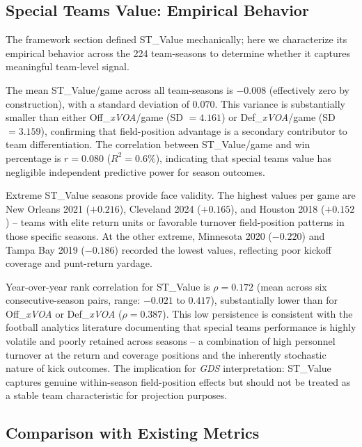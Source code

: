 \documentclass[12pt,a4paper]{article}
\newcommand{\xvoa}{\textit{xVOA}}
\newcommand{\gds}{\textit{GDS}}
\begin{document}
\subsection{Special Teams Value: Empirical Behavior}
\label{sec:st-empirical}

The framework section defined ST\_Value mechanically; here we characterize its empirical behavior across the 224 team-seasons to determine whether it captures meaningful team-level signal.

The mean ST\_Value/game across all team-seasons is $-0.008$ (effectively zero by construction), with a standard deviation of $0.070$. This variance is substantially smaller than either Off\_\xvoa{}/game (SD $= 4.161$) or Def\_\xvoa{}/game (SD $= 3.159$), confirming that field-position advantage is a secondary contributor to team differentiation. The correlation between ST\_Value/game and win percentage is $r = 0.080$ ($R^2 = 0.6\%$), indicating that special teams value has negligible independent predictive power for season outcomes.

Extreme ST\_Value seasons provide face validity. The highest values per game are New Orleans 2021 ($+0.216$), Cleveland 2024 ($+0.165$), and Houston 2018 ($+0.152$) -- teams with elite return units or favorable turnover field-position patterns in those specific seasons. At the other extreme, Minnesota 2020 ($-0.220$) and Tampa Bay 2019 ($-0.186$) recorded the lowest values, reflecting poor kickoff coverage and punt-return yardage.

Year-over-year rank correlation for ST\_Value is $\rho = 0.172$ (mean across six consecutive-season pairs, range: $-0.021$ to $0.417$), substantially lower than for Off\_\xvoa{} or Def\_\xvoa{} ($\rho = 0.387$). This low persistence is consistent with the football analytics literature documenting that special teams performance is highly volatile and poorly retained across seasons \citep{schatz2005dvoa} -- a combination of high personnel turnover at the return and coverage positions and the inherently stochastic nature of kick outcomes. The implication for \gds{} interpretation: ST\_Value captures genuine within-season field-position effects but should not be treated as a stable team characteristic for projection purposes.

\subsection{Comparison with Existing Metrics}
\end{document}
